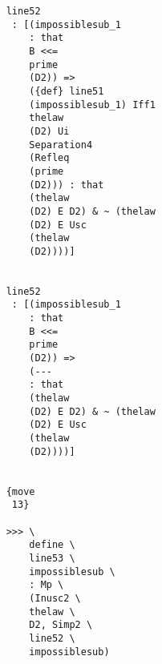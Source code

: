 \documentclass[12pt]{article}
\begin{document}
\begin{verbatim}
                                          line52 
                                           : [(impossiblesub_1 
                                              : that 
                                              B <<= 
                                              prime 
                                              (D2)) => 
                                              ({def} line51 
                                              (impossiblesub_1) Iff1 
                                              thelaw 
                                              (D2) Ui 
                                              Separation4 
                                              (Refleq 
                                              (prime 
                                              (D2))) : that 
                                              (thelaw 
                                              (D2) E D2) & ~ (thelaw 
                                              (D2) E Usc 
                                              (thelaw 
                                              (D2))))]


                                          line52 
                                           : [(impossiblesub_1 
                                              : that 
                                              B <<= 
                                              prime 
                                              (D2)) => 
                                              (--- 
                                              : that 
                                              (thelaw 
                                              (D2) E D2) & ~ (thelaw 
                                              (D2) E Usc 
                                              (thelaw 
                                              (D2))))]


                                          {move 
                                           13}

                                          >>> \
                                              define \
                                              line53 \
                                              impossiblesub \
                                              : Mp \
                                              (Inusc2 \
                                              thelaw \
                                              D2, Simp2 \
                                              line52 \
                                              impossiblesub)



\end{verbatim}
\end{document}

